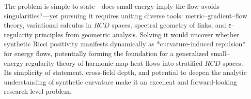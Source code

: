 The problem is simple to state—does small energy imply the flow avoids singularities?—yet pursuing it requires uniting diverse tools: metric–gradient–flow theory, variational calculus in \(RCD\) spaces, spectral geometry of links, and ε–regularity principles from geometric analysis.  Solving it would uncover whether synthetic Ricci positivity manifests dynamically as *curvature-induced repulsion* for energy flows, potentially forming the foundation for a generalized small–energy regularity theory of harmonic map heat flows into stratified \(RCD\) spaces.  Its simplicity of statement, cross-field depth, and potential to deepen the analytic understanding of synthetic curvature make it an excellent and forward-looking research-level problem.
